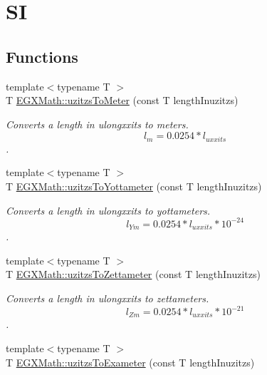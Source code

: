 \hypertarget{group___e_g_x_math-_conversions-_length_conversions-_imperial-uzitzs-_s_i}{}\section{SI}
\label{group___e_g_x_math-_conversions-_length_conversions-_imperial-uzitzs-_s_i}
\subsection*{Functions}
\begin{DoxyCompactItemize}
\item 
{\footnotesize template$<$typename T $>$ }\\T \mbox{\hyperlink{group___e_g_x_math-_conversions-_length_conversions-_imperial-uzitzs-_s_i_gad256d80aa1424b503ded3fda023ee4dd}{E\+G\+X\+Math\+::uzitzs\+To\+Meter}} (const T length\+Inuzitzs)
\begin{DoxyCompactList}\small\item\em Converts a length in ulongxxits to meters. \[ l_{m}=0.0254 * l_{uxxits} \]. \end{DoxyCompactList}\item 
{\footnotesize template$<$typename T $>$ }\\T \mbox{\hyperlink{group___e_g_x_math-_conversions-_length_conversions-_imperial-uzitzs-_s_i_gac20be4db1eed0397d7925d5b7148dd94}{E\+G\+X\+Math\+::uzitzs\+To\+Yottameter}} (const T length\+Inuzitzs)
\begin{DoxyCompactList}\small\item\em Converts a length in ulongxxits to yottameters. \[ l_{Ym}=0.0254 * l_{uxxits} * 10^{-24} \]. \end{DoxyCompactList}\item 
{\footnotesize template$<$typename T $>$ }\\T \mbox{\hyperlink{group___e_g_x_math-_conversions-_length_conversions-_imperial-uzitzs-_s_i_ga43f793911855da08c6649eb9b059d9c2}{E\+G\+X\+Math\+::uzitzs\+To\+Zettameter}} (const T length\+Inuzitzs)
\begin{DoxyCompactList}\small\item\em Converts a length in ulongxxits to zettameters. \[ l_{Zm}=0.0254 * l_{uxxits} * 10^{-21} \]. \end{DoxyCompactList}\item 
{\footnotesize template$<$typename T $>$ }\\T \mbox{\hyperlink{group___e_g_x_math-_conversions-_length_conversions-_imperial-uzitzs-_s_i_ga4c102f14f5804c46db22137411ceb3be}{E\+G\+X\+Math\+::uzitzs\+To\+Exameter}} (const T length\+Inuzitzs)

\end{DoxyCompactItemize}
